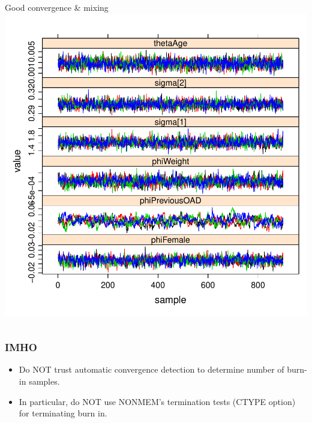 \documentclass{beamer}
\begin{document}
\begin{frame}
\begin{columns}
\vspace{-8pt}
Good convergence \& mixing\\
\includegraphics[width=\textwidth,height=0.4\textheight]{graphics/goodConvergence.pdf}
\end{columns}

\end{frame}

\begin{frame}
\frametitle{IMHO}  

  \begin{itemize}
\item Do NOT trust automatic convergence detection to determine number
of burn-in samples. 
\item In particular, do NOT use NONMEM's termination tests (CTYPE
  option) for terminating burn in.
  \end{itemize}


\end{frame}
\end{document}
